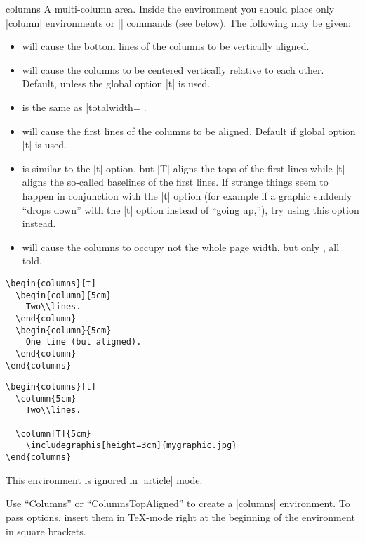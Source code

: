 \begin{environment}{{columns}}
  A multi-column area. Inside the environment you should place only
  |column| environments or |\column| commands (see below). The
  following  may be given: 
  \begin{itemize}
  \item
     will cause the bottom lines of the columns to be
    vertically aligned.
  \item
     will cause the columns to be centered vertically
    relative to each other. Default, unless the global option
    |t| is used. 
  \item
     is the same as |totalwidth=\textwidth|.
  \item
     will cause the first lines of the columns to be
    aligned. Default if global option |t| is used.
  \item
     is similar to the |t| option, but |T| aligns the
    tops of the first lines while |t| aligns the so-called baselines
    of the first lines. If strange things seem to happen in
    conjunction with the |t| option (for example if a graphic suddenly
    ``drops down'' with the |t| option instead of ``going up,''), try
    using this option instead.
  \item
     will cause the columns to occupy
    not the whole page width, but only , all told.
  \end{itemize}
    
  \example
\begin{verbatim}
\begin{columns}[t]
  \begin{column}{5cm}
    Two\\lines.
  \end{column}
  \begin{column}{5cm}
    One line (but aligned).
  \end{column}
\end{columns}
\end{verbatim}
  
  \example
\begin{verbatim}
\begin{columns}[t]
  \column{5cm}
    Two\\lines.

  \column[T]{5cm}
    \includegraphis[height=3cm]{mygraphic.jpg}
\end{columns}
\end{verbatim}

  \articlenote
  This environment is ignored in |article| mode.
  
  \lyxnote
  Use ``Columns'' or ``ColumnsTopAligned'' to create a |columns|
  environment. To pass options, insert them in \TeX-mode right at the
  beginning of the environment in square brackets.
\end{environment}

